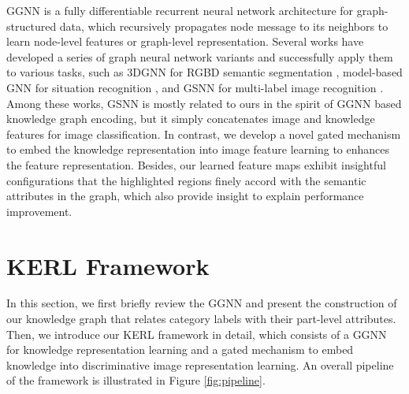 \documentclass{article}
\begin{document}
GGNN \cite{li2015gated} is a fully differentiable recurrent neural network architecture for graph-structured data, which recursively propagates node message to its neighbors to learn node-level features or graph-level representation. Several works have developed a series of graph neural network variants and successfully apply them to various tasks, such as 3DGNN for RGBD semantic segmentation \cite{qi20173d}, model-based GNN for situation recognition \cite{li2017situation}, and GSNN for multi-label image recognition \cite{marino2017more}. Among these works, GSNN \cite{marino2017more} is mostly related to ours in the spirit of GGNN based knowledge graph encoding, but it simply concatenates image and knowledge features for image classification. In contrast, we develop a novel gated mechanism to embed the knowledge representation into image feature learning to enhances the feature representation. Besides, our learned feature maps exhibit insightful configurations that the highlighted regions finely accord with the semantic attributes in the graph, which also provide insight to explain performance improvement.

\section{KERL Framework}
In this section, we first briefly review the GGNN and present the construction of our knowledge graph that relates category labels with their part-level attributes. Then, we introduce our KERL framework in detail, which consists of a GGNN for knowledge representation learning and a gated mechanism to embed knowledge into discriminative image representation learning. An overall pipeline of the framework is illustrated in Figure \ref{fig:pipeline}. 
\end{document}
